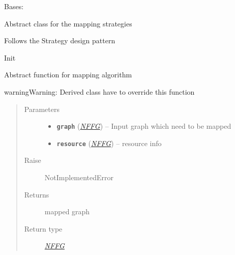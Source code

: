 \documentclass[letterpaper,10pt,english]{sphinxmanual}
\begin{document}
\begin{fulllineitems}
\label{util/mapping:escape.util.mapping.AbstractMappingStrategy}
Bases: \href{https://docs.python.org/2.7/library/functions.html\#object}{}

Abstract class for the mapping strategies

Follows the Strategy design pattern

\begin{fulllineitems}
\label{util/mapping:escape.util.mapping.AbstractMappingStrategy.__init__}
Init

\end{fulllineitems}


\begin{fulllineitems}
\label{util/mapping:escape.util.mapping.AbstractMappingStrategy.map}
Abstract function for mapping algorithm

\begin{notice}{warning}{Warning:}
Derived class have to override this function
\end{notice}
\begin{quote}\begin{description}
\item[{Parameters}] \leavevmode\begin{itemize}
\item {} 
\textbf{\texttt{graph}} ({\hyperref[util/nffg:escape.util.nffg.NFFG]{\emph{\emph{NFFG}}}}) -- Input graph which need to be mapped

\item {} 
\textbf{\texttt{resource}} ({\hyperref[util/nffg:escape.util.nffg.NFFG]{\emph{\emph{NFFG}}}}) -- resource info

\end{itemize}

\item[{Raise}] \leavevmode
NotImplementedError

\item[{Returns}] \leavevmode
mapped graph

\item[{Return type}] \leavevmode
{\hyperref[util/nffg:escape.util.nffg.NFFG]{\emph{NFFG}}}

\end{description}\end{quote}

\end{fulllineitems}


\end{fulllineitems}
\end{document}

